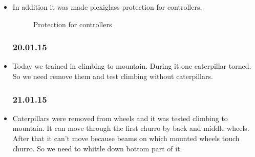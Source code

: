 \begin{itemize}
		\item In addition it was made plexiglass protection for controllers.
		\begin{figure}[H]
			\begin{minipage}[h]{1\linewidth}
				\caption{Protection for controllers}
			\end{minipage}
		\end{figure}
	\subsubsection{20.01.15}	 
		\item Today we trained in climbing to mountain. During it one caterpillar torned. So we need remove them and test climbing without caterpillars.
	\subsubsection{21.01.15}
		\item Caterpillars were removed from wheels and it was tested climbing to mountain. It can move through the first churro by back and middle wheels. After that it can't move because beams on which mounted wheels touch churro. So we need to whittle down bottom part of it. 
		 	
\end{itemize}
\fillpage